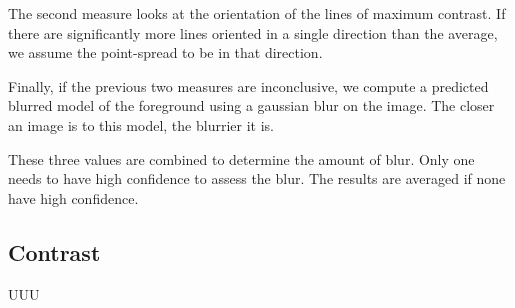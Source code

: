 \documentclass{article}
\begin{document}
The second measure looks at the orientation of the lines of maximum contrast. If there are significantly more lines oriented in a single direction than the average, we assume the point-spread to be in that direction. %

Finally, if the previous two measures are inconclusive, we compute a predicted blurred model of the foreground using a gaussian blur on the image. The closer an image is to this model, the blurrier it is.

These three values are combined to determine the amount of blur. Only one needs to have high confidence to assess the blur. The results are averaged if none have high confidence.%


\subsection{Contrast}

UUU



\end{document}
